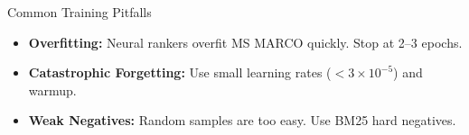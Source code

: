\documentclass[aspectratio=169]{beamer}
\newif\ifanimated
\newcommand{\cpause}{\ifanimated\pause\fi}
\begin{document}


% 





\begin{frame}{Common Training Pitfalls}
\begin{itemize}
    \item \textbf{Overfitting:} Neural rankers overfit MS MARCO quickly. Stop at 2--3 epochs.
    \item \textbf{Catastrophic Forgetting:} Use small learning rates ($< 3 \times 10^{-5}$) and warmup.
    \item \textbf{Weak Negatives:} Random samples are too easy. Use BM25 hard negatives.
\end{itemize}\cpause
\end{frame}
\end{document}
